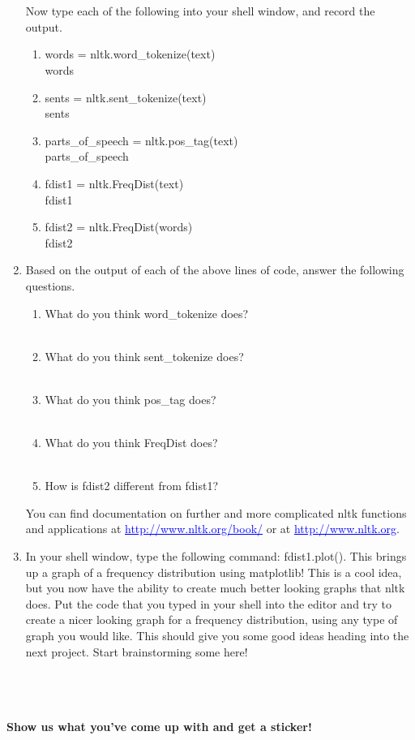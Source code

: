 \documentclass[11pt, letterpaper, onecolumn, oneside, final]{article}
\begin{document}
\begin{enumerate}
\\
\\
Now type each of the following into your shell window, and record the output.
\begin{enumerate}
    \item {\consolas words = nltk.word\_tokenize(text)\\words}
    \item {\consolas sents = nltk.sent\_tokenize(text)\\sents}
    \item {\consolas parts\_of\_speech = nltk.pos\_tag(text)\\parts\_of\_speech}
    \item {\consolas fdist1 = nltk.FreqDist(text)\\fdist1}
    \item {\consolas fdist2 = nltk.FreqDist(words)\\fdist2}
\end{enumerate}
\item Based on the output of each of the above lines of code, answer the following questions.
\begin{enumerate}
\item What do you think {\consolas word\_tokenize} does?\\\\
\item What do you think {\consolas sent\_tokenize} does?\\\\
\item What do you think {\consolas pos\_tag} does?\\\\
\item What do you think {\consolas FreqDist} does?\\\\
\item How is {\consolas fdist2} different from {\consolas fdist1}?\\
\end{enumerate}
You can find documentation on further and more complicated {\consolas nltk} functions and applications at \textcolor{blue}{\underline{http://www.nltk.org/book/}} or at \textcolor{blue}{\underline{http://www.nltk.org}}.
\newpage
\item In your shell window, type the following command:
{\consolas fdist1.plot()}. This brings up a graph of a frequency distribution using {\consolas matplotlib}! This is a cool idea, but you now have the ability to create much better looking graphs that {\consolas nltk} does. Put the code that you typed in your shell into the editor and try to create a nicer looking graph for a frequency distribution, using any type of graph you would like. This should give you some good ideas heading into the next project. Start brainstorming some here!\\\\\\\\
\end{enumerate}
\textbf{Show us what you've come up with and get a sticker!}
\end{document}
